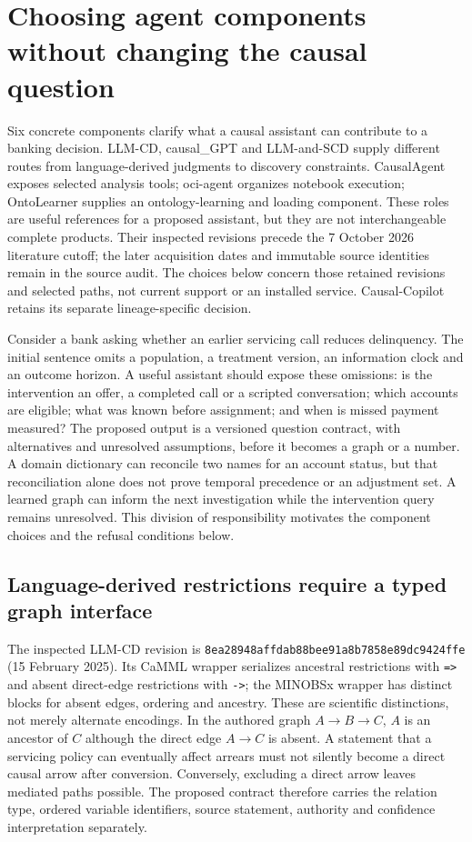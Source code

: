 \section{Choosing agent components without changing the causal question}
\label{sec:exec25-agents-reuse}
Six concrete components clarify what a causal assistant can contribute to a
banking decision. LLM-CD, causal\_GPT and LLM-and-SCD supply different routes
from language-derived judgments to discovery constraints. CausalAgent exposes
selected analysis tools; oci-agent organizes notebook execution; OntoLearner
supplies an ontology-learning and loading component. These roles are useful
references for a proposed assistant, but they are not interchangeable complete
products. Their inspected revisions precede the 7 October 2026 literature cutoff;
the later acquisition dates and immutable source identities remain in the
source audit. The choices below concern those retained revisions and selected
paths, not current support or an installed service. Causal-Copilot retains its
separate lineage-specific decision.~\citep{exec14_iid_cd,exec14_iid_gpt,exec14_iid_scd,exec13_data_causalagent_code,exec13_data_oci_code,exec13_data_ontolearner_code}

Consider a bank asking whether an earlier servicing call reduces delinquency.
The initial sentence omits a population, a treatment version, an information
clock and an outcome horizon. A useful assistant should expose these omissions:
is the intervention an offer, a completed call or a scripted conversation;
which accounts are eligible; what was known before assignment; and when is
missed payment measured? The proposed output is a versioned question contract,
with alternatives and unresolved assumptions, before it becomes a graph or a
number. A domain dictionary can reconcile two names for an account status, but
that reconciliation alone does not prove temporal precedence or an adjustment
set. A learned graph can inform the next investigation while the intervention
query remains unresolved. This division of responsibility motivates the
component choices and the refusal conditions below.~\citep{exec25_agents_choice}

\subsection{Language-derived restrictions require a typed graph interface}
The inspected LLM-CD revision is
\texttt{8ea28948affdab88bee91}\allowbreak\texttt{a8b7858e89dc9424ffe}
(15 February 2025). Its CaMML wrapper serializes ancestral restrictions with
\texttt{=>} and absent direct-edge restrictions with \texttt{->}; the MINOBSx
wrapper has distinct blocks for absent edges, ordering and ancestry. These are
scientific distinctions, not merely alternate encodings. In the authored graph
$A\to B\to C$, $A$ is an ancestor of $C$ although the direct edge $A\to C$ is
absent. A statement that a servicing policy can eventually affect arrears must
not silently become a direct causal arrow after conversion. Conversely,
excluding a direct arrow leaves mediated paths possible. The proposed contract
therefore carries the relation type, ordered variable identifiers, source
statement, authority and confidence interpretation separately.~\citep{exec14_iid_cd,exec25_agents_choice}

